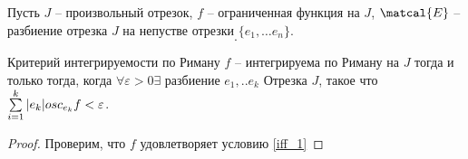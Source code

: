 \documentclass[12pt]{report}
\begin{document}
\begin{note}
    Пусть $ J$ -- произвольный отрезок, $ f$ -- ограниченная функция на $ J$, $ \matcal{E}$ -- разбиение отрезка $ J  $ на непустве отрезки $ \{e_1, \ldots  e_n\}$.
    \[
    .\] 
\end{note}
\begin{thm}{Критерий интегрируемости по Риману}
    $ f$ -- интегрируема по Риману на $ J$ тогда и только тогда, когда $ \forall  \varepsilon >0 \exists $ разбиение $ e_1, .. e_k$ Отрезка $ J$, такое что $ \sum\limits_{i=1}^{k}|e_k| osc_{e_k} f < \varepsilon $. \label{iff_1}
\end{thm}
\begin{proof}
    Проверим, что $ f$ удовлетворяет условию  \ref{iff_1}
\end{proof}
\end{document}
